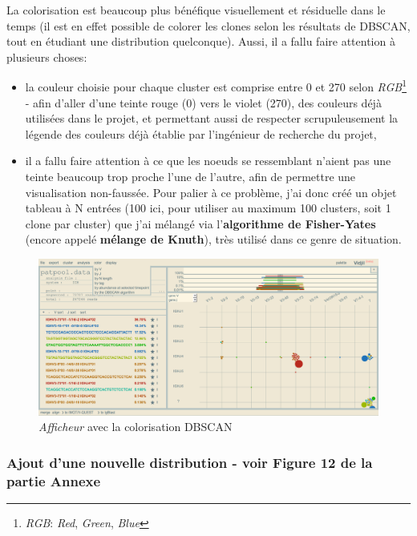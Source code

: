 \documentclass[pdftex,12pt,a4paper]{report}
\begin{document}
\begin{spacing}{1.2}
La colorisation est beaucoup plus bénéfique visuellement et résiduelle dans le temps (il est en effet possible de colorer les clones selon les résultats de DBSCAN, tout en étudiant une distribution quelconque).
\newline
Aussi, il a fallu faire attention à plusieurs choses:
	\begin{itemize}
		\item{la couleur choisie pour chaque cluster est comprise entre 0 et 270 selon \textit{RGB}\footnote{\textit{RGB}: \textit{Red}, \textit{Green}, \textit{Blue}} - afin d'aller d'une teinte rouge (0) vers le violet (270), des couleurs déjà utilisées dans le projet, et permettant aussi de respecter scrupuleusement la légende des couleurs déjà établie par l'ingénieur de recherche du projet,}
		\item{il a fallu faire attention à ce que les noeuds se ressemblant n'aient pas une teinte beaucoup trop proche l'une de l'autre, afin de permettre une visualisation non-faussée.
			\newline
			Pour palier à ce problème, j'ai donc créé un objet tableau à N entrées (100 ici, pour utiliser au maximum 100 clusters, soit 1 clone par cluster) que j'ai mélangé via l'\textbf{algorithme de Fisher-Yates} (encore appelé \textbf{mélange de Knuth}), très utilisé dans ce genre de situation.}
	\end{itemize}

\begin{figure}[H]
\begin{center}
	\includegraphics[scale=0.35]{img/DBSCAN-Color-Ex.jpg}
\end{center}
\caption{\textit{Afficheur} avec la colorisation DBSCAN}
\end{figure}

\subsubsection{Ajout d'une nouvelle distribution - voir \textbf{Figure 12} de la partie \textbf{Annexe}}


\end{spacing}
\end{document}
